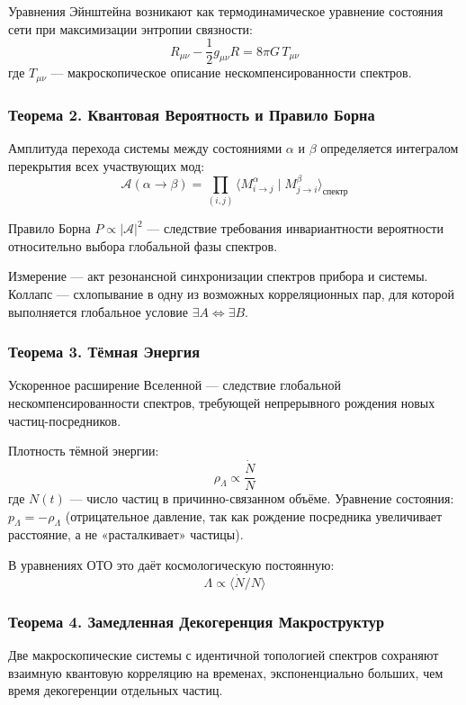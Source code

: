 \documentclass[12pt,a4paper]{article}
\begin{document}
Уравнения Эйнштейна возникают как термодинамическое уравнение состояния сети при максимизации энтропии связности:
\begin{equation}
    R_{\mu\nu} - \frac{1}{2} g_{\mu\nu} R = 8\pi G \, T_{\mu\nu}
\end{equation}
где $T_{\mu\nu}$ --- макроскопическое описание нескомпенсированности спектров.

\subsubsection{Теорема 2. Квантовая Вероятность и Правило Борна}
Амплитуда перехода системы между состояниями $\alpha$ и $\beta$ определяется интегралом перекрытия всех участвующих мод:
\begin{equation}
    \mathcal{A}(\alpha \to \beta) = \prod_{(i,j)} \langle M_{i \to j}^\alpha \mid M_{j \to i}^\beta \rangle_{\text{спектр}}
\end{equation}

Правило Борна $P \propto |\mathcal{A}|^2$ --- следствие требования инвариантности вероятности относительно выбора глобальной фазы спектров.

Измерение --- акт резонансной синхронизации спектров прибора и системы. Коллапс --- схлопывание в одну из возможных корреляционных пар, для которой выполняется глобальное условие $\exists A \iff \exists B$.

\subsubsection{Теорема 3. Тёмная Энергия}
Ускоренное расширение Вселенной --- следствие глобальной нескомпенсированности спектров, требующей непрерывного рождения новых частиц-посредников.

Плотность тёмной энергии:
\begin{equation}
    \rho_\Lambda \propto \frac{\dot{N}}{N}
\end{equation}
где $N(t)$ --- число частиц в причинно-связанном объёме. Уравнение состояния: $p_\Lambda = -\rho_\Lambda$ (отрицательное давление, так как рождение посредника увеличивает расстояние, а не «расталкивает» частицы).

В уравнениях ОТО это даёт космологическую постоянную:
\begin{equation}
    \Lambda \propto \langle \dot{N}/N \rangle
\end{equation}

\subsubsection{Теорема 4. Замедленная Декогеренция Макроструктур}
Две макроскопические системы с идентичной топологией спектров сохраняют взаимную квантовую корреляцию на временах, экспоненциально больших, чем время декогеренции отдельных частиц.
\end{document}
